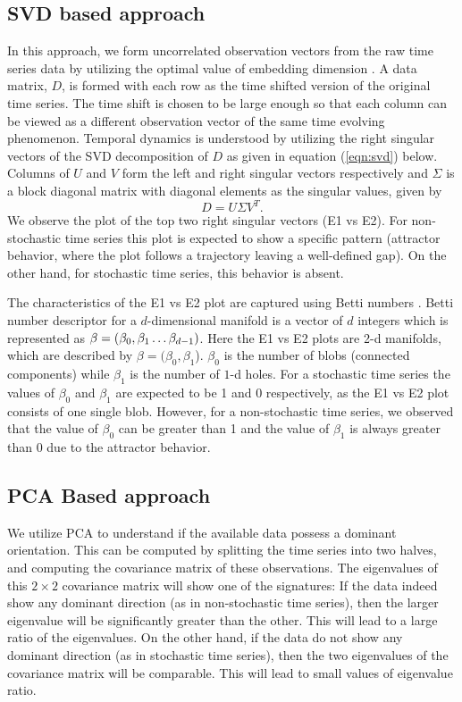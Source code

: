 \documentclass[journal]{IEEEtran}
\begin{document}
\subsection{SVD based approach}
In this approach, we form uncorrelated observation vectors from the raw time series data by utilizing the optimal value of embedding dimension \cite{misra2006}. A data matrix, $D$, is formed with each row  as the  time shifted version of the original time series. The time shift is chosen to be large enough so that each column can be viewed as a different observation vector of the same time evolving phenomenon. Temporal dynamics is understood by utilizing the right singular vectors of the SVD decomposition of $D$ as given in equation (\ref{eqn:svd}) below. Columns of $U$ and $V$  form the left and right singular vectors respectively and $\Sigma$ is a block diagonal matrix with diagonal elements as the singular values, given by
\begin{equation}
D = U \Sigma V^T.
\label{eqn:svd}
\end{equation}
We observe the plot of the top two right singular vectors (E1 vs E2). For non-stochastic time series this plot is expected to show a specific pattern (attractor behavior, where the plot follows a trajectory leaving a well-defined gap). On the other hand, for stochastic time series, this behavior is absent.

The characteristics of the E1 vs E2 plot are captured using Betti numbers \cite{jmlr}. Betti number descriptor for a $d$-dimensional manifold is a vector of $d$ integers which is represented as $\beta = (\beta_0, \beta_1 \mathellipsis \beta_{d-1})$. Here the E1 vs E2 plots are 2-d manifolds, which are described by  $\beta=(\beta_{0}, \beta_{1}$).  $\beta_{0}$ is the number of blobs (connected components) while $\beta_1$ is the number of $1$-d holes. For a stochastic time series the values of $\beta_{0}$  and $\beta_1$ are expected to be 1 and 0 respectively, as the E1 vs E2 plot consists of one single blob. However, for a non-stochastic time series, we observed that the value of $\beta_{0}$ can be greater than 1 and the value of $\beta_1$ is always greater than 0 due to the attractor behavior.


\subsection{PCA Based approach}
We utilize PCA to understand if the available data possess a dominant orientation. This can be computed by splitting the time series into two halves, and computing the covariance matrix of these observations. The eigenvalues of this $2 \times 2$ covariance matrix will show one of the signatures: If the data indeed show any dominant direction (as in non-stochastic time series), then the larger eigenvalue will be significantly greater than the other. This will lead to a large ratio of the eigenvalues. On the other hand, if the data do not show any dominant direction (as in stochastic time series), then the two eigenvalues of the covariance matrix will be comparable. This will lead to small values of eigenvalue ratio.
\end{document}
